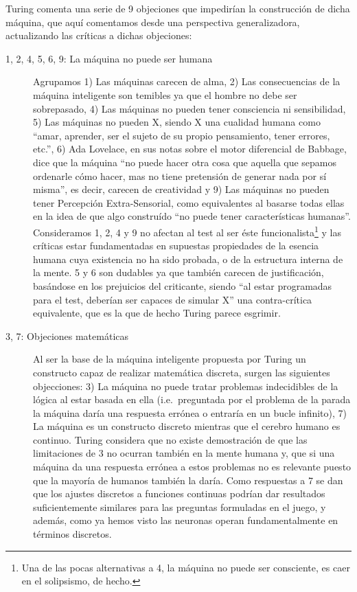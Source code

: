 \documentclass[12pt]{memoir}
\begin{document}
Turing comenta una serie de 9 objeciones que impedirían la construcción de dicha máquina, que aquí comentamos desde una perspectiva generalizadora, actualizando las críticas a dichas objeciones:

\begin{description}
	\item[1, 2, 4, 5, 6, 9: La máquina no puede ser humana] Agrupamos 1) Las máquinas carecen de alma, 2) Las consecuencias de la máquina inteligente son temibles ya que el hombre no debe ser sobrepasado, 4) Las máquinas no pueden tener consciencia ni sensibilidad, 5) Las máquinas no pueden X, siendo X una cualidad humana como ``amar, aprender, ser el sujeto de su propio pensamiento, tener errores, etc.'', 6) Ada Lovelace, en sus notas sobre el motor diferencial de Babbage, dice que la máquina ``no puede hacer otra cosa que aquella que sepamos ordenarle cómo hacer, mas no tiene pretensión de generar nada por sí misma'', es decir, carecen de creatividad y 9) Las máquinas no pueden tener Percepción Extra-Sensorial, como equivalentes al basarse todas ellas en la idea de que algo construído ``no puede tener características humanas''. Consideramos 1, 2, 4 y 9 no afectan al test al ser éste funcionalista\footnote{Una de las pocas alternativas a 4, la máquina no puede ser consciente, es caer en el solipsismo, de hecho.} y las críticas estar fundamentadas en supuestas propiedades de la esencia humana cuya existencia no ha sido probada, o de la estructura interna de la mente. 5 y 6 son dudables ya que también carecen de justificación, basándose en los prejuicios del criticante, siendo ``al estar programadas para el test, deberían ser capaces de simular X'' una contra-crítica equivalente, que es la que de hecho Turing parece esgrimir.
	\item[3, 7: Objeciones matemáticas] Al ser la base de la máquina inteligente propuesta por Turing un constructo capaz de realizar matemática discreta, surgen las siguientes objecciones: 3) La máquina no puede tratar problemas indecidibles de la lógica al estar basada en ella (i.e.\ preguntada por el problema de la parada la máquina daría una respuesta errónea o entraría en un bucle infinito), 7) La máquina es un constructo discreto mientras que el cerebro humano es continuo. Turing considera que no existe demostración de que las limitaciones de 3 no ocurran también en la mente humana y, que si una máquina da una respuesta errónea a estos problemas no es relevante puesto que la mayoría de humanos también la daría. Como respuestas a 7 se dan que los ajustes discretos a funciones continuas podrían dar resultados suficientemente similares para las preguntas formuladas en el juego, y además, como ya hemos visto las neuronas operan fundamentalmente en términos discretos.

\end{description}
\end{document}
